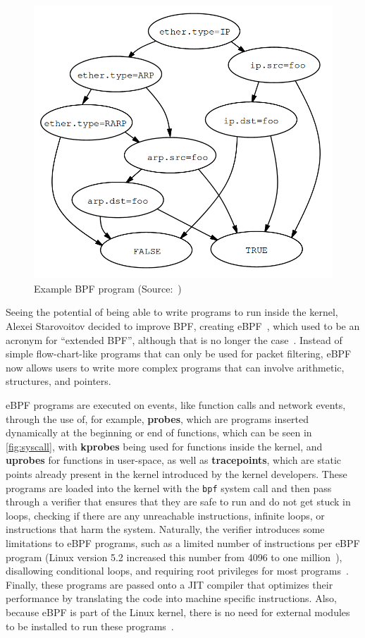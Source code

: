 \begin{figure}[htb]
   \centering
   \includegraphics[scale=.3]{bpfprog}
   \caption{Example BPF program (Source:~\cite{bpf})}\label{fig:bpfprog}
\end{figure}

Seeing the potential of being able to write programs to run inside the kernel,
Alexei Starovoitov decided to improve \ac{BPF}, creating eBPF~\cite{alexei},
which used to be an acronym for ``extended BPF'', although that is no longer the
case~\cite{ebpfio}. Instead of simple flow-chart-like programs that can only be
used for packet filtering, eBPF now allows users to write more complex programs
that can involve arithmetic, structures, and pointers.

eBPF programs are executed on events, like function calls and network events,
through the use of, for example, \textbf{probes}, which are programs inserted
dynamically at the beginning or end of functions, which can be seen in
\autoref{fig:syscall}, with \textbf{kprobes} being used for functions inside the
kernel, and \textbf{uprobes} for functions in user-space, as well as
\textbf{tracepoints}, which are static points already present in the kernel
introduced by the kernel developers. These programs are loaded into the kernel
with the \texttt{bpf} system call and then pass through a verifier that ensures
that they are safe to run and do not get stuck in loops, checking if there are
any unreachable instructions, infinite loops, or instructions that harm the
system. Naturally, the verifier introduces some limitations to eBPF programs,
such as a limited number of instructions per eBPF program (Linux version 5.2
increased this number from 4096 to one million~\cite{sizelimit}), disallowing
conditional loops, and requiring root privileges for most programs~\cite{lwm}.
Finally, these programs are passed onto a \ac{JIT} compiler that optimizes their
performance by translating the code into machine specific instructions. Also,
because eBPF is part of the Linux kernel, there is no need for external modules
to be installed to run these programs~\cite{ebpfio}.


